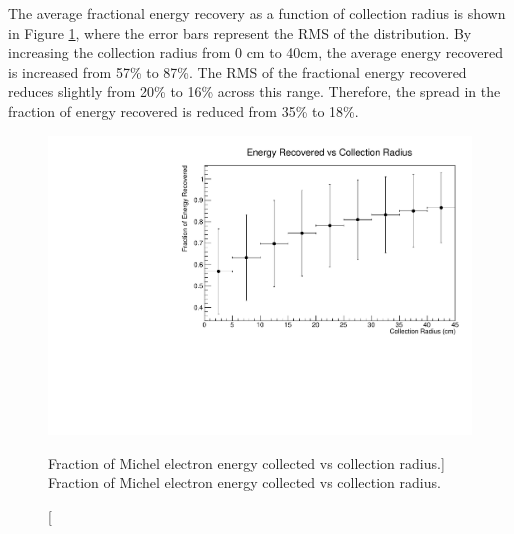 The average fractional energy recovery as a function of collection radius is
shown in Figure \ref{fig:frac_v_radius}, where the error bars represent the RMS
of the distribution. By increasing the collection radius from 0 cm to 40cm, 
the average energy recovered is increased from 57\% to 87\%. The RMS of the
fractional energy recovered reduces slightly from 20\% to 16\% across this
range. Therefore, the spread in the fraction of energy recovered is reduced 
from 35\% to 18\%. 
\begin{figure}
	\centering
	\includegraphics[width=\textwidth]{figures/energy_recovery_v_radius.pdf}
	\caption
	[Fraction of Michel electron energy collected vs collection radius.]
	{Fraction of Michel electron energy collected vs collection radius.}
	\label{fig:frac_v_radius}
\end{figure}

